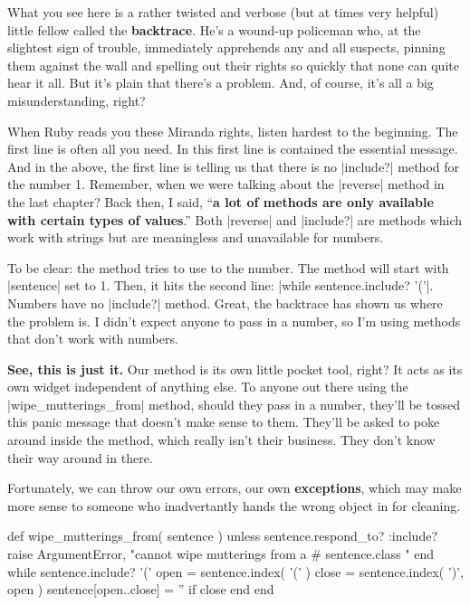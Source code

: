 \documentclass[12pt,twoside]{report}
\begin{document}
What you see here is a rather twisted and verbose (but at times very
helpful) little fellow called the {\bf backtrace}.  He's a wound-up
policeman who, at the slightest sign of trouble, immediately
apprehends any and all suspects, pinning them against the wall and
spelling out their rights so quickly that none can quite hear it all.
But it's plain that there's a problem.  And, of course, it's all a big
misunderstanding, right?

When Ruby reads you these Miranda rights, listen hardest to the
beginning.  The first line is often all you need.  In this first line
is contained the essential message.  And in the above, the first line
is telling us that there is no \rubyinline|include?|
method for the number 1. Remember, when we were talking about the
\rubyinline|reverse| method in the last chapter?  Back
then, I said, ``{\bf a lot of methods are only available with certain
  types of values}.''  Both \rubyinline|reverse| and
\rubyinline|include?| are methods which work with
strings but are meaningless and unavailable for numbers.

To be clear: the method tries to use to the number.  The method will
start with \rubyinline|sentence| set to 1. Then, it
hits the second line: 
\rubyinline|while sentence.include? '('|.  
Numbers have no \rubyinline|include?| method.  Great,
the backtrace has shown us where the problem is.  I didn't expect
anyone to pass in a number, so I'm using methods that don't work with
numbers.

{\bf See, this is just it.}  Our method is its own little pocket tool,
right?  It acts as its own widget independent of anything else.  To
anyone out there using the
\rubyinline|wipe_mutterings_from| method, should they
pass in a number, they'll be tossed this panic message that doesn't
make sense to them.  They'll be asked to poke around inside the
method, which really isn't their business.  They don't know their way
around in there.

Fortunately, we can throw our own errors, our own {\bf exceptions},
which may make more sense to someone who inadvertantly hands the wrong
object in for cleaning.


\begin{rubycode}

 def wipe_mutterings_from( sentence )
   unless sentence.respond_to? :include?
     raise ArgumentError,
       "cannot wipe mutterings from a #{ sentence.class }"
   end
   while sentence.include? '('
     open = sentence.index( '(' )
     close = sentence.index( ')', open )
     sentence[open..close] = '' if close
   end
 end

\end{rubycode}
\end{document}

